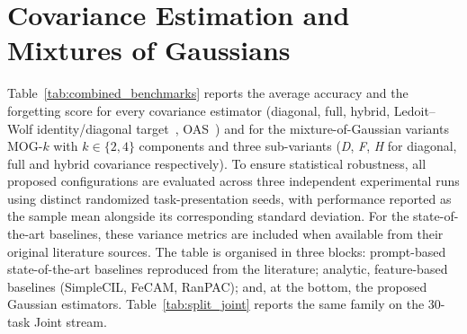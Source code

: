 \section{Covariance Estimation and Mixtures of Gaussians}

\label{sec:covariance_results}
Table~\ref{tab:combined_benchmarks} reports the average accuracy and the forgetting score for every covariance estimator (diagonal, full, hybrid, Ledoit--Wolf identity/diagonal target~\cite{Ledoit2004}, OAS~\cite{Chen2010}) and for the mixture-of-Gaussian variants MOG-$k$ with $k\in\{2,4\}$ components and three sub-variants (\textit{D}, \textit{F}, \textit{H} for diagonal, full and hybrid covariance respectively). 
To ensure statistical robustness, all proposed configurations are evaluated across three independent experimental runs using distinct randomized task-presentation seeds, with performance reported as the sample mean alongside its corresponding standard deviation. For the state-of-the-art baselines, these variance metrics are included when available from their original literature sources.
The table is organised in three blocks: prompt-based state-of-the-art baselines reproduced from the literature; analytic, feature-based baselines (SimpleCIL, FeCAM, RanPAC); and, at the bottom, the proposed Gaussian estimators. Table~\ref{tab:split_joint} reports the same family on the 30-task Joint stream.

